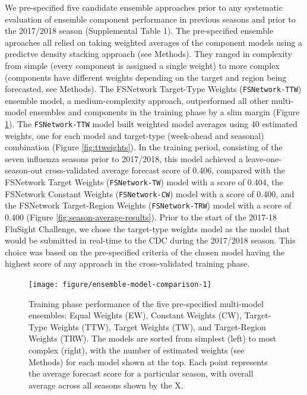 \documentclass{article}\usepackage[]{graphicx}\usepackage[]{color}
\newenvironment{knitrout}{}{} %
\begin{document}
We pre-specified five candidate ensemble approaches prior to any systematic evaluation of ensemble component performance in previous seasons and prior to the 2017/2018 season (Supplemental Table 1).\cite{Reich2017github} 
The pre-specified ensemble aproaches all relied on taking weighted averages of the component models using a predictve density stacking approach (see Methods).
They ranged in complexity from simple (every component is assigned a single weight) to more complex (components have different weights depending on the target and region being forecasted, see Methods).
The FSNetwork Target-Type Weights ({\tt FSNetwork-TTW}) ensemble model, a medium-complexity approach, outperformed all other multi-model ensembles and components in the training phase by a slim margin (Figure \ref{fig:ensemble-model-comparison}). 
The {\tt FSNetwork-TTW} model built weighted model averages using 40 estimated weights, one for each model and target-type (week-ahead and seasonal) combination (Figure \ref{fig:ttweights}).
In the training period, consisting of the seven influenza seasons prior to 2017/2018, this model achieved a leave-one-season-out cross-validated average forecast score of 
0.406, 
compared with 
the FSNetwork Target Weights ({\tt FSNetwork-TW}) model with a score of 0.404, 
the FSNetwork Constant Weights ({\tt FSNetwork-CW}) model with a score of 0.400, and 
the FSNetwork Target-Region Weights ({\tt FSNetwork-TRW}) model with a score of 0.400 (Figure \ref{fig:season-average-results}).
Prior to the start of the 2017-18 FluSight Challenge, we chose the target-type weights model as the model that would be submitted in real-time to the CDC during the 2017/2018 season. 
This choice was based on the pre-specified criteria of the chosen model having the highest score of any approach in the cross-validated training phase.\cite{Reich2017github}

\begin{knitrout}
\color{fgcolor}\begin{figure}
\texttt{[image: figure/ensemble-model-comparison-1]} \caption[Training phase performance of the five pre-specified multi-model ensembles]{Training phase performance of the five pre-specified multi-model ensembles: Equal Weights (EW), Constant Weights (CW), Target-Type Weights (TTW), Target Weights (TW), and Target-Region Weights (TRW). The models are sorted from simplest (left) to most complex (right), with the number of estimated weights (see Methods) for each model shown at the top. Each point represents the average forecast score for a particular season, with overall average across all seasons shown by the X. }\label{fig:ensemble-model-comparison}
\end{figure}


\end{knitrout}
\end{document}
